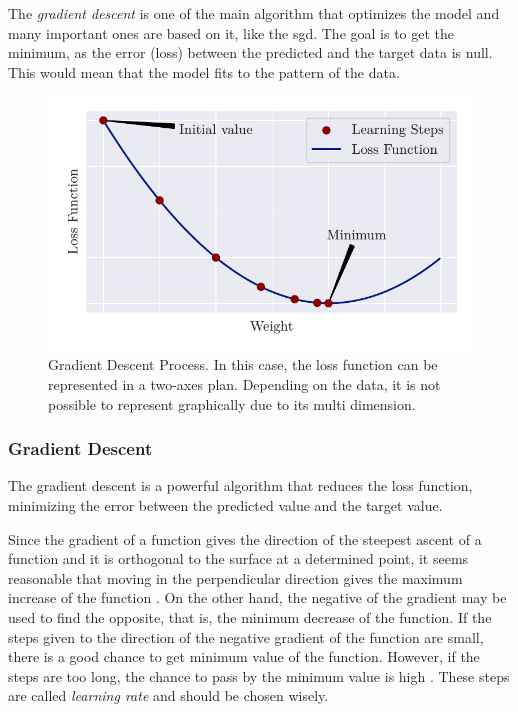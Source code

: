 The \emph{gradient descent} is one of the main algorithm \citep{nesterov2004} that optimizes the model and many important ones are based on it, like the \gls*{sgd}. The goal is to get the minimum, as the error (loss) between the predicted and the target data is null. This would mean that the model fits to the pattern of the data.
%
\begin{figure}[H]
    \centering
    \includegraphics{figures/3review/nn/gradient_descent.pdf}
    \caption[Gradient Descent Process]{Gradient Descent Process. In this case, the loss function can be represented in a two-axes plan. Depending on the data, it is not possible to represent graphically due to its multi dimension.}
\end{figure}

\subsubsection*{Gradient Descent} 

The gradient descent is a powerful algorithm that reduces the loss function, minimizing the error between the predicted value and the target value.

Since the gradient of a function gives the direction of the steepest ascent of a function and it is orthogonal to the surface at a determined point, it seems reasonable that moving in the perpendicular direction gives the maximum increase of the function \cite{stewart2016}.
On the other hand, the negative of the gradient may be used to find the opposite, that is, the minimum decrease of the function.
If the steps given to the direction of the negative gradient of the function are small, there is a good chance to get minimum value of the function.
However, if the steps are too long, the chance to pass by the minimum value is high \citep{nielsen2015}.
These steps are called \emph{learning rate} and should be chosen wisely.

